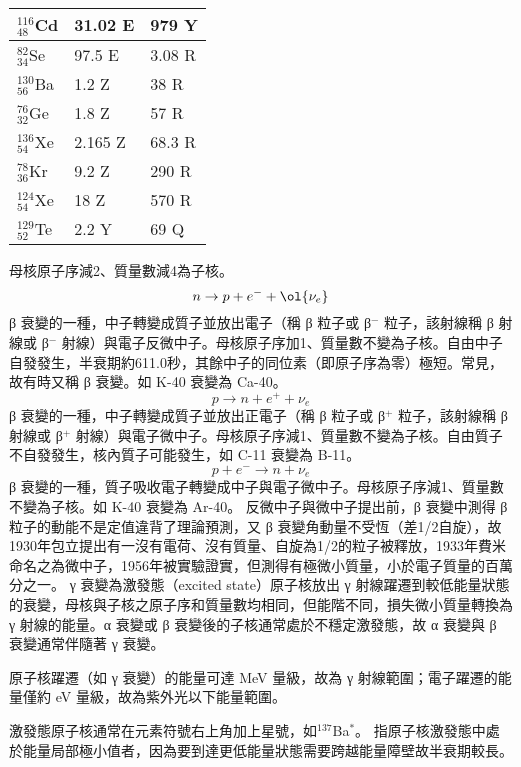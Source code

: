 \documentclass[a4paper,12pt]{article}
\begin{document}
\begin{itemize}
\begin{longtable}[c]{|p{0.25\tw}|p{0.25\tw}|p{0.25\tw}|}
$_{48}^{116}$Cd & 31.02 E & 979 Y \\\hline
$_{34}^{82}$Se & 97.5 E & 3.08 R \\\hline
$_{56}^{130}$Ba & 1.2 Z & 38 R \\\hline
$_{32}^{76}$Ge & 1.8 Z & 57 R \\\hline
$_{54}^{136}$Xe & 2.165 Z & 68.3 R \\\hline
$_{36}^{78}$Kr & 9.2 Z & 290 R \\\hline
$_{54}^{124}$Xe & 18 Z & 570 R \\\hline
$_{52}^{129}$Te & 2.2 Y & 69 Q \\\hline
\end{longtable}\FB
{}
母核原子序減2、質量數減4為子核。
\[n \rightarrow p + e^- + \ol{\nu_e}\]
β 衰變的一種，中子轉變成質子並放出電子（稱 β 粒子或 β$^-$ 粒子，該射線稱 β 射線或 β$^-$ 射線）與電子反微中子。母核原子序加1、質量數不變為子核。自由中子自發發生，半衰期約611.0秒，其餘中子的同位素（即原子序為零）極短。常見，故有時又稱 β 衰變。如 K-40 衰變為 Ca-40。
\[p \rightarrow n + e^+ + \nu_e\]
β 衰變的一種，中子轉變成質子並放出正電子（稱 β 粒子或 β$^+$ 粒子，該射線稱 β 射線或 β$^+$ 射線）與電子微中子。母核原子序減1、質量數不變為子核。自由質子不自發發生，核內質子可能發生，如 C-11 衰變為 B-11。
\[p + e^- \rightarrow n + \nu_e\]
β 衰變的一種，質子吸收電子轉變成中子與電子微中子。母核原子序減1、質量數不變為子核。如 K-40 衰變為 Ar-40。
反微中子與微中子提出前，β 衰變中測得 β 粒子的動能不是定值違背了理論預測，又 β 衰變角動量不受恆（差1/2自旋），故1930年包立提出有一沒有電荷、沒有質量、自旋為1/2的粒子被釋放，1933年費米命名之為微中子，1956年被實驗證實，但測得有極微小質量，小於電子質量的百萬分之一。
γ 衰變為激發態（excited state）原子核放出 γ 射線躍遷到較低能量狀態的衰變，母核與子核之原子序和質量數均相同，但能階不同，損失微小質量轉換為 γ 射線的能量。α 衰變或 β 衰變後的子核通常處於不穩定激發態，故 α 衰變與 β 衰變通常伴隨著 γ 衰變。

原子核躍遷（如 γ 衰變）的能量可達 MeV 量級，故為 γ 射線範圍；電子躍遷的能量僅約 eV 量級，故為紫外光以下能量範圍。

激發態原子核通常在元素符號右上角加上星號，如$^{137}$Ba$^*$。
指原子核激發態中處於能量局部極小值者，因為要到達更低能量狀態需要跨越能量障壁故半衰期較長。


\end{itemize}
\end{document}
